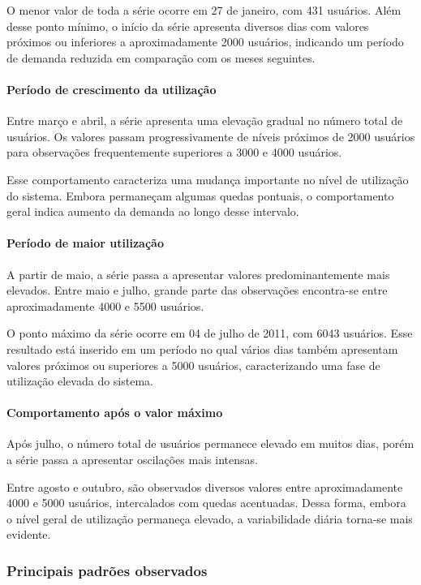 \documentclass[12pt,a4paper]{article}
\begin{document}
O menor valor de toda a série ocorre em 27 de janeiro, com 431 usuários. Além
desse ponto mínimo, o início da série apresenta diversos dias com valores
próximos ou inferiores a aproximadamente 2000 usuários, indicando um período de
demanda reduzida em comparação com os meses seguintes.

\paragraph{Período de crescimento da utilização}

Entre março e abril, a série apresenta uma elevação gradual no número total de
usuários. Os valores passam progressivamente de níveis próximos de 2000 usuários
para observações frequentemente superiores a 3000 e 4000 usuários.

Esse comportamento caracteriza uma mudança importante no nível de utilização do
sistema. Embora permaneçam algumas quedas pontuais, o comportamento geral indica
aumento da demanda ao longo desse intervalo.

\paragraph{Período de maior utilização}

A partir de maio, a série passa a apresentar valores predominantemente mais
elevados. Entre maio e julho, grande parte das observações encontra-se entre
aproximadamente 4000 e 5500 usuários.

O ponto máximo da série ocorre em 04 de julho de 2011, com 6043 usuários. Esse
resultado está inserido em um período no qual vários dias também apresentam
valores próximos ou superiores a 5000 usuários, caracterizando uma fase de
utilização elevada do sistema.

\paragraph{Comportamento após o valor máximo}

Após julho, o número total de usuários permanece elevado em muitos dias, porém
a série passa a apresentar oscilações mais intensas.

Entre agosto e outubro, são observados diversos valores entre aproximadamente
4000 e 5000 usuários, intercalados com quedas acentuadas. Dessa forma, embora o
nível geral de utilização permaneça elevado, a variabilidade diária torna-se
mais evidente.

\subsubsection{Principais padrões observados}
\end{document}
